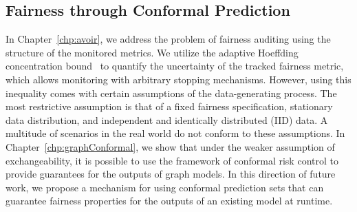\subsection{Fairness through Conformal Prediction}
In Chapter~\ref{chp:avoir}, we address the problem of fairness auditing using the structure of the monitored metrics.
We utilize the adaptive Hoeffding concentration bound~\cite{zhao2016adaptive} to quantify the uncertainty of the tracked fairness metric, which allows monitoring with arbitrary stopping mechanisms.
However, using this inequality comes with certain assumptions of the data-generating process.
The most restrictive assumption is that of a fixed fairness specification, stationary data distribution, and independent and identically distributed (IID) data.
A multitude of scenarios in the real world do not conform to these assumptions.
In Chapter~\ref{chp:graphConformal}, we show that under the weaker assumption of exchangeability, it is possible to use the framework of conformal risk control to provide guarantees for the outputs of graph models.
In this direction of future work, we propose a mechanism for using conformal prediction sets that can guarantee fairness properties for the outputs of an existing model at runtime.
